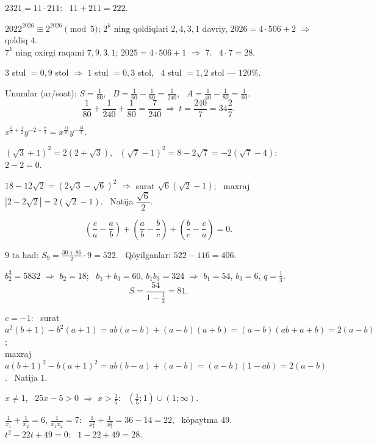 




$2321=11\cdot211$: \ $11+211=222$.

$2022^{2026}\equiv2^{2026}\pmod5$; $2^k$ ning qoldiqlari $2,4,3,1$ davriy, $2026=4\cdot506+2$ $\Rightarrow$ qoldiq $4$.\\
$7^k$ ning oxirgi raqami $7,9,3,1$; $2025=4\cdot506+1$ $\Rightarrow$ $7$. \ $4\cdot7=28$.

$3$ stul $=0{,}9$ stol $\Rightarrow$ $1$ stul $=0{,}3$ stol, \ $4$ stul $=1{,}2$ stol — $120\%$.

Unumlar (ar/soat): $S=\frac1{80}$, \ $B=\frac1{60}-\frac1{80}=\frac1{240}$, \ $A=\frac1{40}-\frac1{80}=\frac1{80}$.
\[\frac1{80}+\frac1{240}+\frac1{80}=\frac7{240}\ \Rightarrow\ t=\frac{240}7=34\frac27.\]

$x^{\frac35+\frac12}y^{-2-\frac73}=x^{\frac{11}{10}}y^{-\frac{13}3}$.

$\left(\sqrt3+1\right)^2=2\left(2+\sqrt3\right)$, \ $\left(\sqrt7-1\right)^2=8-2\sqrt7=-2\left(\sqrt7-4\right)$: \ $2-2=0$.

$18-12\sqrt2=\left(2\sqrt3-\sqrt6\right)^2$ $\Rightarrow$ surat $\sqrt6\left(\sqrt2-1\right)$; \ maxraj $\left|2-2\sqrt2\right|=2\left(\sqrt2-1\right)$. \ Natija $\dfrac{\sqrt6}2$.

\[\left(\frac ca-\frac ab\right)+\left(\frac ab-\frac bc\right)+\left(\frac bc-\frac ca\right)=0.\]

$9$ ta had: $S_9=\frac{30+86}2\cdot9=522$. \ Qöyilganlar: $522-116=406$.

$b_2^3=5832$ $\Rightarrow$ $b_2=18$; \ $b_1+b_3=60$, $b_1b_3=324$ $\Rightarrow$ $b_1=54$, $b_3=6$, $q=\frac13$.
\[S=\frac{54}{1-\frac13}=81.\]

$c=-1$: \ surat $a^2(b+1)-b^2(a+1)=ab(a-b)+(a-b)(a+b)=(a-b)(ab+a+b)=2(a-b)$;\\
maxraj $a(b+1)^2-b(a+1)^2=ab(b-a)+(a-b)=(a-b)(1-ab)=2(a-b)$. \ Natija $1$.

$x\ne1$, \ $25x-5>0$ $\Rightarrow$ $x>\frac15$: \ $\left(\frac15;1\right)\cup(1;\infty)$.

$\frac1{x_1}+\frac1{x_2}=6$, $\frac1{x_1x_2}=7$: \ $\frac1{x_1^2}+\frac1{x_2^2}=36-14=22$, \ köpaytma $49$.\\
$t^2-22t+49=0$: \ $1-22+49=28$.

